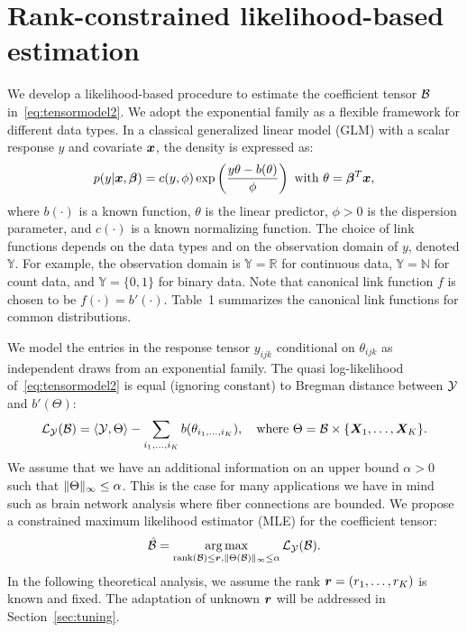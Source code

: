 \documentclass{article}
\theoremstyle{plain}
\theoremstyle{definition}
\begin{document}
\section{Rank-constrained likelihood-based estimation}
\vspace{-.2cm}
We develop a likelihood-based procedure to estimate the coefficient tensor $\mathcal{B}$ in~\eqref{eq:tensormodel2}. We adopt the exponential family as a flexible framework for different data types. In a classical generalized linear model (GLM) with a scalar response $y$ and covariate $\bm x$, the density is expressed as:
\vspace{-.03cm}
\begin{equation*}
    p(y|\bm x, \boldsymbol{\beta})=c(y,\phi)\exp\left(\frac{y\theta- b(\theta) }{ \phi}\right)\ \text{with}\ \theta=\boldsymbol{\beta}^T\bm x,
\end{equation*}
\vspace{-.03cm}
where $b(\cdot)$ is a known function, $\theta$ is the linear predictor, $\phi>0$ is the dispersion parameter, and $c(\cdot)$ is a known normalizing function. The choice of link functions depends on the data types and on the observation domain of $y$, denoted $\mathbb{Y}$. For example, the observation domain is $\mathbb{Y}=\mathbb{R}$ for continuous data, $\mathbb{Y}=\mathbb{N}$ for count data, and  $\mathbb{Y}=\{0,1\}$ for binary data. 
Note that canonical link function $f$ is chosen to be $f(\cdot)=b'(\cdot)$. Table~1 summarizes the canonical link functions for common distributions. 

We model the entries in the response tensor $y_{ijk}$ conditional on $\theta_{ijk}$ as independent draws from an exponential family. The quasi log-likelihood of~\eqref{eq:tensormodel2} is equal (ignoring constant) to Bregman distance between $\mathcal{Y}$ and $b'(\Theta)$:
\begin{align}
\mathcal{L}_{\mathcal{Y}}(\mathcal{B})=\langle \mathcal{Y}, \Theta \rangle - \sum_{i_1,\ldots,i_K} b(\theta_{i_1,\ldots,i_K}),\quad
\text{where}\ \Theta=\mathcal{B}\times\{\bm X_1,\ldots,\bm X_K\}.
\end{align}
We assume that we have an additional information on an upper bound $\alpha>0$ such that $\lVert\Theta\rVert_\infty\leq \alpha$. This is the case for many applications we have in mind such as brain network analysis where fiber connections are bounded. We propose a constrained maximum likelihood estimator (MLE) for the coefficient tensor:
\begin{equation}\label{eq:MLE}
\hat {\mathcal{B}}=\operatorname*{arg\,max}_{\text{rank}(\mathcal{B})\leq \bm{r}, \lVert\Theta(\mathcal{B})\rVert_\infty\leq \alpha} \mathcal{L}_{\mathcal{Y}}(\mathcal{B}).
\end{equation}
In the following theoretical analysis, we assume the rank $\bm{r}=(r_1,\ldots,r_K)$ is known and fixed. The adaptation of unknown $\bm{r}$ will be addressed in Section~\ref{sec:tuning}. 
\end{document}
